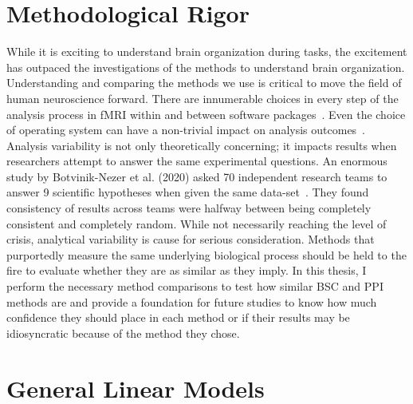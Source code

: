 \documentclass[phd,appendix,figures]{uithesis}
\begin{document}
\section{Methodological Rigor}

While it is exciting to understand brain organization during tasks,
the excitement has outpaced the investigations of the methods to understand brain organization.
Understanding and comparing the methods we use is critical to move the field of
human neuroscience forward.
There are innumerable choices in every step of the analysis process in
fMRI within and between software packages~\cite{Bowring2019,Carp2012}.
Even the choice of operating system can have a non-trivial impact on
analysis outcomes~\cite{Glatard2015}.
Analysis variability is not only theoretically concerning; it impacts
results when researchers attempt to answer the same experimental questions.
An enormous study by Botvinik-Nezer et al. (2020) asked 70 independent research teams
to answer 9 scientific hypotheses when given the same data-set~\cite{Botvinik-Nezer2020}.
They found consistency of results across teams were halfway between
being completely consistent and completely random.
While not necessarily reaching the level of crisis,
analytical variability is cause for serious consideration.
Methods that purportedly measure the same underlying biological process
should be held to the fire to evaluate whether they are as similar
as they imply.
In this thesis, I perform the necessary method comparisons
to test how similar BSC and PPI methods are and provide a foundation
for future studies to know how much confidence they should
place in each method or if their results may be idiosyncratic
because of the method they chose.

\section{General Linear Models}
\end{document}
